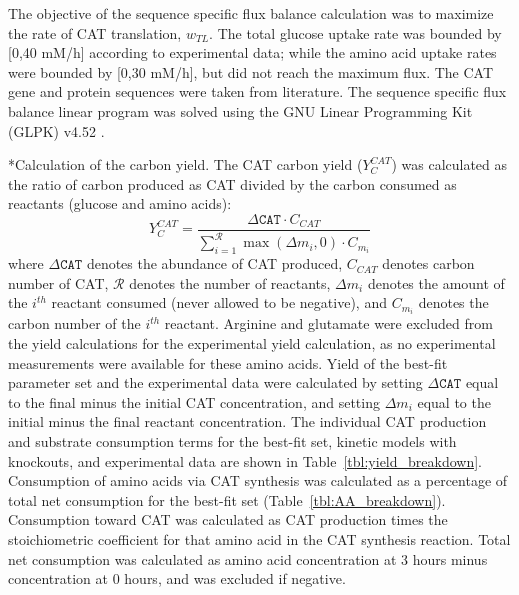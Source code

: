 \documentclass[12pt]{article}
\makeatletter
\renewcommand\subsubsection{\@startsection
	{subsubsection}{2}{0mm}
	{-0.05in}
	{-0.5\baselineskip}
	{\normalfont\normalsize\itshape}}
\makeatother
\begin{document}
The objective of the sequence specific flux balance calculation was to maximize the rate of CAT translation, $w_{TL}$.
The total glucose uptake rate was bounded by [0,40 mM/h] according to experimental data;
while the amino acid uptake rates were bounded by [0,30 mM/h], but did not reach the maximum flux.
The CAT gene and protein sequences were taken from literature.
The sequence specific flux balance linear program was solved using the GNU Linear Programming Kit (GLPK) v4.52 \cite{GLPK}.

\subsubsection*{Calculation of the carbon yield.}
The CAT carbon yield ($Y_{C}^{CAT}$) was calculated as the ratio of carbon produced as CAT divided by the carbon consumed as reactants (glucose and amino acids):
\begin{equation}\label{eqn:yield-definition}
	Y_{C}^{CAT}=\frac{\Delta\texttt{CAT}\cdot C_{CAT}}{\displaystyle\sum_{i=1}^{\mathcal{R}}\max(\Delta m_{i},0)\cdot C_{m_i}}
\end{equation}
where $\Delta\texttt{CAT}$ denotes the abundance of CAT produced, $C_{CAT}$ denotes carbon number of CAT, $\mathcal{R}$ denotes the number of reactants,
$\Delta m_{i}$ denotes the amount of the $i^{th}$ reactant consumed (never allowed to be negative), and $C_{m_i}$ denotes the carbon number of the $i^{th}$ reactant.
Arginine and glutamate were excluded from the yield calculations for the experimental yield calculation, as no experimental measurements were available for these amino acids.
Yield of the best-fit parameter set and the experimental data were calculated by setting $\Delta\texttt{CAT}$ equal to the final minus the initial CAT concentration,
and setting $\Delta m_{i}$ equal to the initial minus the final reactant concentration.
The individual CAT production and substrate consumption terms for the best-fit set, kinetic models with knockouts, and experimental data are shown in Table~\ref{tbl:yield_breakdown}.
Consumption of amino acids via CAT synthesis was calculated as a percentage of total net consumption for the best-fit set (Table~\ref{tbl:AA_breakdown}).
Consumption toward CAT was calculated as CAT production times the stoichiometric coefficient for that amino acid in the CAT synthesis reaction.
Total net consumption was calculated as amino acid concentration at 3 hours minus concentration at 0 hours, and was excluded if negative.
\end{document}
